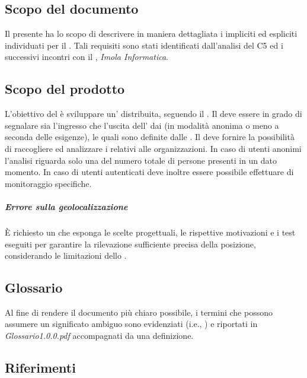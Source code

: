 \documentclass[../analisi-dei-requisiti.tex]{subfiles}
\begin{document}
\subsection{Scopo del documento}%
\label{sub:scopo_del_documento}
Il presente  ha lo scopo di descrivere in maniera dettagliata i  impliciti ed espliciti individuati per il . Tali requisiti sono stati identificati dall'analisi del  C5 ed i successivi incontri con il , \textit{Imola Informatica}.

\subsection{Scopo del prodotto}%
\label{sub:scopo_del_prodotto}
L'obiettivo del  è sviluppare un' distribuita, seguendo il .
Il  deve essere in grado di segnalare sia l'ingresso che l'uscita dell' dai  (in modalità anonima o meno a seconda delle esigenze), le quali sono definite dalle .
Il  deve fornire la possibilità di raccogliere ed analizzare i  relativi alle organizzazioni.
In caso di utenti anonimi l'analisi riguarda solo una  del numero totale di persone presenti in un dato momento.
In caso di utenti autenticati deve inoltre essere possibile effettuare  di monitoraggio specifiche.
\subparagraph*{Errore sulla geolocalizzazione}%
\label{subp:errore_sulla_geolocalizzazione}
È richiesto un  che esponga le scelte progettuali, le rispettive motivazioni e i test eseguiti per garantire la rilevazione sufficiente precisa della posizione, considerando le limitazioni dello .


\subsection{Glossario}%
\label{sub:glossario}
Al fine di rendere il documento più chiaro possibile, i termini che possono assumere un significato ambiguo sono evidenziati (i.e., ) e riportati in \textit{Glossario1.0.0.pdf} accompagnati da una definizione.

\subsection{Riferimenti}%
\label{sub:riferimenti}
\end{document}
